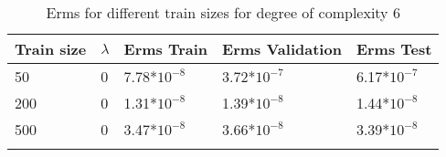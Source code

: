 \begin{center}
\begin{longtable}{l l l l l}
\hline
\hline
\textbf{Train size} & \textbf{$\lambda$} & \textbf{Erms Train} & \textbf{Erms Validation} & \textbf{Erms Test}\\
\hline
\hline
50 & 0 & 7.78*$10^{-8}$ & 3.72*$10^{-7}$ & 6.17*$10^{-7}$  \\
200 & 0 & 1.31*$10^{-8}$ & 1.39*$10^{-8}$ & 1.44*$ 10^{-8}$  \\
500 & 0 & 3.47*$10^{-8}$ & 3.66*$10^{-8}$ & 3.39*$10^{-8}$\\
\hline
\caption{Erms for different train sizes for degree of complexity 6}
\end{longtable}
\end{center}

